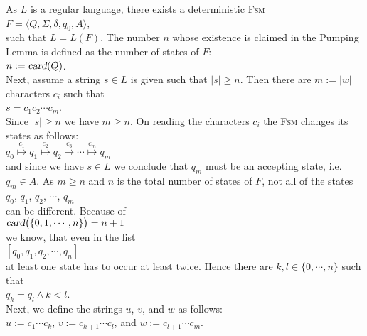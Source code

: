\proofEng
As $L$ is a regular language, there exists a deterministic \textsc{Fsm}
\\[0.2cm]
\hspace*{1.3cm}
$F = \langle Q, \Sigma, \delta, q_0, A \rangle$,
\\[0.2cm]
such that $L = L(F)$.  The number $n$ whose existence is claimed in the Pumping Lemma is defined as
the number of states of $F$: 
\\[0.2cm]
\hspace*{1.3cm}
$n := \textsl{card}(Q)$.
\\[0.2cm]
Next, assume a string $s \in L$ is given such that $|s| \geq n$.  Then there are $m := |w|$
characters $c_i$ such that
\\[0.2cm]
\hspace*{1.3cm}
$s = c_1 c_2 \cdots c_m$.
\\[0.2cm]
Since $|s| \geq n$ we have $m \geq n$.  On reading the characters $c_i$ the \textsc{Fsm} changes its
states as follows:
\\[0.2cm]
\hspace*{1.3cm}
$q_0 \stackrel{c_1}{\longmapsto} q_1 \stackrel{c_2}{\longmapsto} q_2 \stackrel{c_3}{\longmapsto} \cdots \stackrel{c_m}{\longmapsto} q_m$
\\[0.2cm]
and since we have  $s \in L$ we conclude that  $q_m$ must be an accepting state, i.e.~$q_m \in A$.
As $m \geq n$ and $n$ is the total number of states of $F$, not all of the states 
\\[0.2cm]
\hspace*{1.3cm}
$q_0$, $q_1$, $q_2$, $\cdots$, $q_m$
\\[0.2cm]
can be different.
Because of
\\[0.2cm]
\hspace*{1.3cm}
$\textsl{card}\bigl(\{0,1,\cdots,n\}\bigr) = n+1$
\\[0.2cm]
we know, that even in the list
\\[0.2cm]
\hspace*{1.3cm}
$[q_0,q_1,q_2,\cdots, q_{n}]$
\\[0.2cm]
at least one state has to occur at least twice.  Hence there are $k, l \in \{0,\cdots,n\}$ such that
\\[0.2cm]
\hspace*{1.3cm}
$q_k = q_l \wedge k < l$.
\\[0.2cm]
Next, we define the strings $u$, $v$, and $w$ as follows:
\\[0.2cm]
\hspace*{1.3cm}
$u := c_1 \cdots c_k$, \quad $v := c_{k+1} \cdots c_l$, \quad and \quad $w := c_{l+1} \cdots c_{m}$.
